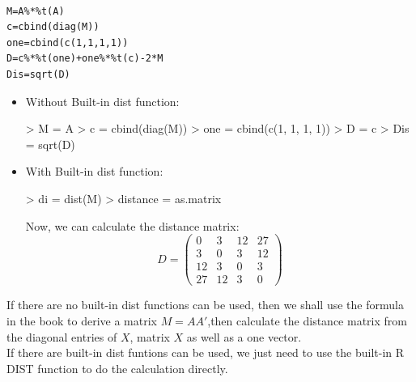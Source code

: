 \documentclass[12pt]{article}
\begin{document}
\newpage
{}\\
\begin{lstlisting}[caption=R codes for Ex 7.24, label=code:distance]
M=A%*%t(A)
c=cbind(diag(M))
one=cbind(c(1,1,1,1))
D=c%*%t(one)+one%*%t(c)-2*M
Dis=sqrt(D)
\end{lstlisting}

\begin{itemize}
\item Without Built-in dist function:\\
\begin{Schunk}
\begin{Sinput}
> M = A %
> c = cbind(diag(M))
> one = cbind(c(1, 1, 1, 1))
> D = c %
> Dis = sqrt(D)
\end{Sinput}
\end{Schunk}

\item With Built-in dist function:\\
\begin{Schunk}
\begin{Sinput}
> di = dist(M)
> distance = as.matrix
\end{Sinput}
\end{Schunk}
Now, we can calculate the distance matrix:
$$D=
\begin{pmatrix}
0&3&12&27\\
3&0&3&12\\
12&3&0&3\\
27&12&3&0
\end{pmatrix}$$
  
\end{itemize}

If there are no built-in dist functions can be used, then we shall use the formula in the book to derive a matrix $M=AA'$,then calculate the distance matrix from the diagonal entries of $X$, matrix $X$ as well as a one vector.\\

If there are built-in dist funtions can be used, we just need to use the built-in R DIST function to do the calculation directly.\\
\end{document}
